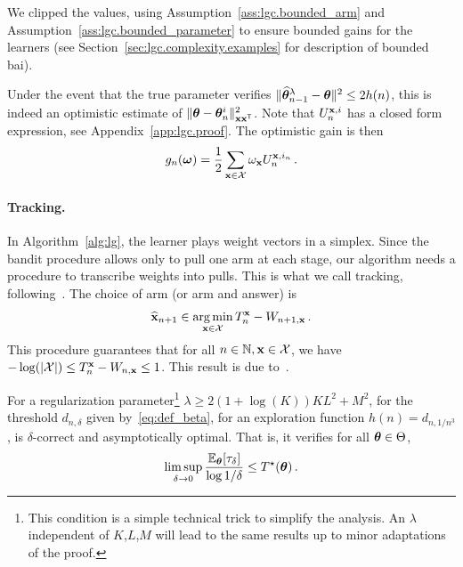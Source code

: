 We clipped the values, using Assumption~\ref{ass:lgc.bounded_arm} and Assumption~\ref{ass:lgc.bounded_parameter} to ensure bounded gains for the learners (see Section~\ref{sec:lgc.complexity.examples} for description of bounded \gls{bai}). 

Under the event that the true parameter verifies $\Vert \widehat{{\boldsymbol \theta}}_{n-1}^\lambda - {\boldsymbol \theta} \Vert^2 \le 2 h(n)$, this is indeed an optimistic estimate of $\Vert {\boldsymbol \theta} - {\boldsymbol \theta}_n^i \Vert^2_{{\bf x}{\bf x}^\mathsf{\scriptscriptstyle T}}$. Note that $U_n^{{\bf x},i}$ has a closed form expression, see Appendix~\ref{app:lgc.proof}. The optimistic gain is then
\[
    g_{n}({\boldsymbol \omega}) = \frac{1}{2}\sum_{{\bf x}\in\mathcal{X}}\omega_{\bf x} U_n^{{\bf x},i_n}\,.
\]


\paragraph{Tracking.} In Algorithm~\ref{alg:lg}, the learner plays weight vectors in a simplex. Since the bandit procedure allows only to pull one arm at each stage, our algorithm needs a procedure to transcribe weights into pulls. This is what we call tracking, following~\citet{garivier2016tracknstop}. The choice of arm (or arm and answer) is
\begin{align*}
    \widehat{{\bf x}}_{n+1} \in \operatorname*{arg\,min}_{{\bf x}\in \mathcal{X} } T_n^{{\bf x}} - W_{n+1,{\bf x}}\,.
\end{align*}
This procedure guarantees that for all $n\in{\mathbb N}, {\bf x}\in\mathcal{X}$, we have $- \log (|\mathcal{X}|) \le T_n^{{\bf x}} - W_{n,{\bf x}} \le 1$. This result is due to~\citet{degenne2020structure}.

\begin{theorem}\label{thm:lgc.sample_complexity}
\begin{leftbar}[theorembar]
For a regularization parameter\footnote{This condition is a simple technical trick to simplify the analysis. An $\lambda$ independent of $K$,$L$,$M$ will lead to the same results up to minor adaptations of the proof.} $\lambda \geq 2(1+\log(K))KL^2+M^2$, for the threshold $d_{n,\delta}$ given by~\eqref{eq:def_beta}, for an exploration function $h(n)=d_{n,1/n^3}$, \LG{} is $\delta$-correct and asymptotically optimal. That is, it verifies for all ${\boldsymbol \theta}\in \Theta$,
\begin{align*}
    \limsup_{\delta\to 0}\frac{\mathbb{E}_{\boldsymbol \theta}[\tau_\delta]}{ \log 1/\delta} \le T^{\star}({\boldsymbol \theta}) \,.
\end{align*}
\end{leftbar}
\end{theorem}

